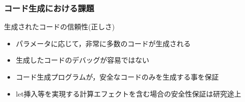 \documentclass[dvipdfmx,cjk,xcolor=dvipsnames,envcountsect,notheorems,12pt,handout]{beamer} \usepackage{pgfpages} \pgfpagesuselayout{4 on 1}[a4paper,landscape,border shrink=5mm]
\theoremstyle{definition}
\begin{document}
\begin{frame}
  \frametitle{コード生成における課題}
  生成されたコードの信頼性(正しさ)
  \begin{itemize}
  \item パラメータに応じて，非常に多数のコードが生成される
  \item 生成したコードのデバッグが容易ではない
  \end{itemize}

  \begin{itemize}
  \item<2-> コード生成プログラムが，安全なコードのみを生成する事を保証
  \item<2-> let挿入等を実現する\alert{計算エフェクトを含む場合の安全性保証は研究途上}
  \end{itemize}
\end{frame}
\end{document}
